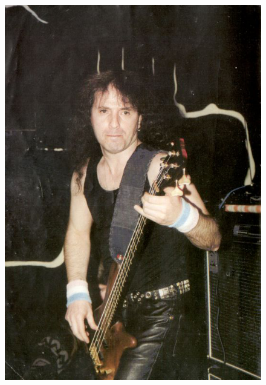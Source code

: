 \documentclass[16pt,a5paper,oneside]{book}
\begin{document}
\begin{figure}
    \centering
    \includegraphics[scale=0.6]{Cover2}
\end{figure}

\maketitle
\end{document}
